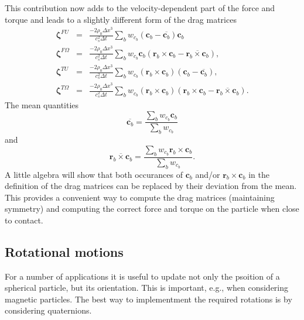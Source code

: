 This contribution
now adds to the velocity-dependent part of the force and torque and
leads to a slightly different form of the drag matrices
\begin{eqnarray}
\boldsymbol{\zeta}^{FU} &=& \frac{-2\rho_0 \Delta x^3}{c_s^2 \Delta t}
\sum_b w_{c_b} (\mathbf{c}_b - \overline{\mathbf{c}_b}) \mathbf{c}_b
\\
\boldsymbol{\zeta}^{F\Omega} &=& \frac{-2\rho_0 \Delta x^3}{c_s^2 \Delta t}
\sum_b w_{c_b} \mathbf{c}_b (\mathbf{r}_b \times \mathbf{c}_b -
\overline{\mathbf{r}_b\times\mathbf{c}_b}),
\\
\boldsymbol{\zeta}^{TU} &=& \frac{-2\rho_0 \Delta x^3}{c_s^2 \Delta t}
\sum_b w_{c_b} (\mathbf{r}_b\times\mathbf{c}_b)
(\mathbf{c}_b - \overline{\mathbf{c}_b}),
\\
\boldsymbol{\zeta}^{T\Omega} &=& \frac{-2\rho_0 \Delta x^3}{c_s^2 \Delta t}
\sum_b w_{c_b} (\mathbf{r}_b\times\mathbf{c}_b)
(\mathbf{r}_b\times\mathbf{c}_b - \overline{\mathbf{r}_b\times\mathbf{c}_b}).
\end{eqnarray}
The mean quantities
\begin{equation}
\overline{\mathbf{c}_b} = \frac{\sum_b w_{c_b} \mathbf{c}_b}{ \sum_b w_{c_b}}
\end{equation}
and
\begin{equation}
\overline{\mathbf{r}_b\times\mathbf{c}_b} =
\frac{\sum_b w_{c_b} \mathbf{r}_b\times\mathbf{c}_b}{\sum_b w_{c_b}}.
\end{equation}
A little algebra will show that both occurances of $\mathbf{c}_b$ and/or
$\mathbf{r}_b\times\mathbf{c}_b$ in the definition of the drag matrices
can be replaced by their deviation from the mean. This provides a
convenient way to compute the drag matrices (maintaining symmetry)
and computing the correct force and torque on the particle when close
to contact.



\subsection{Rotational motions}


For a number of applications it is useful to update not only
the psoition of a spherical particle, but its orientation. This
is important, e.g., when considering magnetic particles. The
best way to implementment the required rotations is by
considering quaternions.

